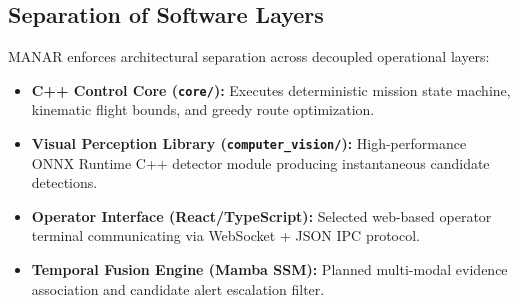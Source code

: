 \subsection{Separation of Software Layers}
MANAR enforces architectural separation across decoupled operational layers:
\begin{itemize}
    \item \textbf{C++ Control Core (\texttt{core/}):} Executes deterministic mission state machine, kinematic flight bounds, and greedy route optimization.
    \item \textbf{Visual Perception Library (\texttt{computer\_vision/}):} High-performance ONNX Runtime C++ detector module producing instantaneous candidate detections.
    \item \textbf{Operator Interface (React/TypeScript):} Selected web-based operator terminal communicating via WebSocket + JSON IPC protocol.
    \item \textbf{Temporal Fusion Engine (Mamba SSM):} Planned multi-modal evidence association and candidate alert escalation filter.
\end{itemize}

